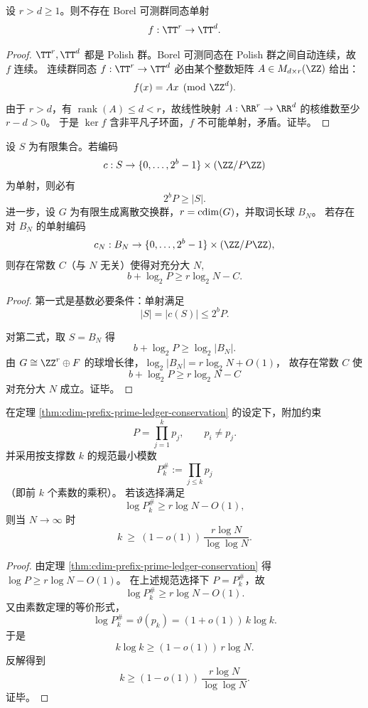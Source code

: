\begin{proposition}[可测同态下圆维不可坍缩]\label{prop:cdim-borel-homomorphism-noncollapse}
设 \(r>d\ge 1\)。则不存在 Borel 可测群同态单射
\[
f:\TT^r\to\TT^d.
\]
\end{proposition}
\begin{proof}
\(\TT^r,\TT^d\) 都是 Polish 群。Borel 可测同态在 Polish 群之间自动连续，故 \(f\) 连续。
连续群同态 \(f:\TT^r\to\TT^d\) 必由某个整数矩阵 \(A\in M_{d\times r}(\ZZ)\) 给出：
\[
f(x)=Ax\pmod{\ZZ^d}.
\]
由于 \(r>d\)，有 \(\operatorname{rank}(A)\le d<r\)，故线性映射 \(A:\RR^r\to\RR^d\) 的核维数至少 \(r-d>0\)。
于是 \(\ker f\) 含非平凡子环面，\(f\) 不可能单射，矛盾。证毕。
\end{proof}

\begin{theorem}[前缀--素数账本守恒不等式]\label{thm:cdim-prefix-prime-ledger-conservation}
设 \(S\) 为有限集合。若编码
\[
c:S\to\{0,\dots,2^b-1\}\times(\ZZ/P\ZZ)
\]
为单射，则必有
\[
2^bP\ge |S|.
\]
进一步，设 \(G\) 为有限生成离散交换群，\(r=\operatorname{cdim}(G)\)，并取词长球 \(B_N\)。
若存在对 \(B_N\) 的单射编码
\[
c_N:B_N\to\{0,\dots,2^b-1\}\times(\ZZ/P\ZZ),
\]
则存在常数 \(C\)（与 \(N\) 无关）使得对充分大 \(N\),
\[
b+\log_2 P\ge r\log_2 N-C.
\]
\end{theorem}
\begin{proof}
第一式是基数必要条件：单射满足
\[
|S|=|c(S)|\le 2^bP.
\]

对第二式，取 \(S=B_N\) 得
\[
b+\log_2 P\ge \log_2|B_N|.
\]
由 \(G\cong\ZZ^r\oplus F\) 的球增长律，\(\log_2|B_N|=r\log_2N+O(1)\)，
故存在常数 \(C\) 使
\[
b+\log_2 P\ge r\log_2N-C
\]
对充分大 \(N\) 成立。证毕。
\end{proof}

\begin{corollary}[平方自由素数账本下的支撑规模下界]\label{cor:cdim-squarefree-prime-support-growth}
在定理 \ref{thm:cdim-prefix-prime-ledger-conservation} 的设定下，附加约束
\[
P=\prod_{j=1}^{k}p_j,\qquad p_i\neq p_j.
\]
并采用按支撑数 \(k\) 的规范最小模数
\[
P_k^\#:=\prod_{j\le k}p_j
\]
（即前 \(k\) 个素数的乘积）。
若该选择满足
\[
\log P_k^\#\ge r\log N-O(1),
\]
则当 \(N\to\infty\) 时
\[
k\ \ge\ (1-o(1))\,\frac{r\log N}{\log\log N}.
\]
\end{corollary}
\begin{proof}
由定理 \ref{thm:cdim-prefix-prime-ledger-conservation} 得 \(\log P\ge r\log N-O(1)\)。
在上述规范选择下 \(P=P_k^\#\)，故
\[
\log P_k^\#\ge r\log N-O(1).
\]
又由素数定理的等价形式，
\[
\log P_k^\#=\vartheta(p_k)=(1+o(1))\,k\log k.
\]
于是
\[
k\log k\ge (1-o(1))\,r\log N.
\]
反解得到
\[
k\ge (1-o(1))\,\frac{r\log N}{\log\log N}.
\]
证毕。
\end{proof}

